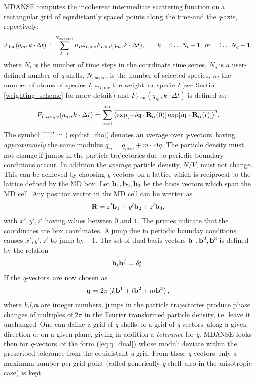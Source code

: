 \documentclass[a4paper,11pt]{article}
\newcommand{\qval}{\textit{q}}
\newcommand{\qvects}{\textit{q}-vectors}
\newcommand{\qshell}{\textit{q}-shell}
\newcommand{\qshells}{\textit{q}-shells}
\begin{document}
\gls{MDANSE} computes the incoherent intermediate scattering function on a rectangular grid of equidistantly spaced points 
along the time-and the \qval-axis, repectively:
\begin{equation}
{\cal F}_{\mathrm{inc}}(q_m,k\cdot\Delta t) \doteq \sum_{I = 1}^{N_{species}} n_I \omega_{I,\mathrm{inc}} F_{I,\mathrm{inc}}(q_m,k\cdot\Delta t),
\qquad k = 0\ldots N_t - 1,\; m = 0\ldots N_q - 1. 
\end{equation}
where $N_t$ is the number of time steps in the coordinate time series, $N_q$ is a user-defined number of \qshells, 
$N_{species}$ is the number of selected species, $n_I$ the number of atoms of species \textit{I}, $\omega_{I,\mathrm{inc}}$ 
the weight for specie \textit{I} (see Section \ref{weighting_scheme} for more details) and $F_{I,\mathrm{inc}}(q_m,k\cdot\Delta t)$ is defined as:
\begin{equation}
\label{eq:disf_rho}
F_{I, inc,\alpha}(q_m,k\cdot\Delta t) = \sum_{\alpha=1}^{n_I}\overline{\langle\exp[-i{\bf q}\cdot{\bf R}_\alpha(0)]\exp[i{\bf q}\cdot{\bf R}_\alpha(t)]\rangle}^q.
\end{equation}
The symbol $\overline{\rule{0pt}{5pt}\ldots}^{q}$ in (\ref{eq:disf_rho}) denotes an average over \qvects\ having 
{\em approximately} the same modulus $q_m = q_{min} + m\cdot\Delta q$. The particle density must not change if jumps in 
the particle trajectories due to periodic boundary conditions occcur. In addition the {\em average} particle density, 
$N/V$, must not change. This can be achieved by choosing \qvects\ on a lattice which is reciprocal to the lattice defined 
by the \gls{MD} box. Let ${\bf b}_1,{\bf b}_2,{\bf b}_3$ be the basis vectors which span the \gls{MD} cell. Any position vector in the 
\gls{MD} cell can be written as
\begin{equation}
{\bf R} = x'{\bf b}_1 + y'{\bf b}_2 + z'{\bf b}_3,
\end{equation}
with $x',y',z'$ having values between $0$ and $1$.  The primes indicate that the coordinates are box coordinates. A jump due 
to periodic bounday conditions causes $x',y',z'$ to jump by $\pm 1$.  The set of dual basis vectors ${\bf b}^1,{\bf b}^2,{\bf b}^3$ 
is defined by the relation
\begin{equation}
{\bf b}_i{\bf b}^j = \delta_i^j.
\end{equation}
If the \qvects\ are now chosen as
\begin{equation}
\label{eq:q_dual}
{\bf q} = 2\pi\left(k{\bf b}^1 + l{\bf b}^2 + m{\bf b}^3\right),
\end{equation}
where \textit{k,l,m} are integer numbers, jumps in the particle trajectories produce phase changes of multiples of $2\pi$ in the 
Fourier transformed particle density, i.e. leave it unchanged. One can define a grid of \qshells\ or a grid of \qvects\ 
along a given direction or on a given plane, giving in addition a {\em tolerance} for \qval. \gls{MDANSE} looks then for 
\qvects\ of the form (\ref{eq:q_dual}) whose moduli deviate within the prescribed tolerance from the equidistant \qval-grid. 
From these \qvects\ only a maximum number per grid-point (called generically \qshell\ also in the anisotropic case) is 
kept.
\end{document}
